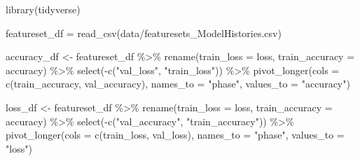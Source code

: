 \documentclass[
]{book}
\newenvironment{Shaded}{\begin{snugshade}}{\end{snugshade}}
\newcommand{\AttributeTok}[1]{\textcolor[rgb]{0.77,0.63,0.00}{#1}}
\newcommand{\FunctionTok}[1]{\textcolor[rgb]{0.00,0.00,0.00}{#1}}
\newcommand{\NormalTok}[1]{#1}
\newcommand{\OtherTok}[1]{\textcolor[rgb]{0.56,0.35,0.01}{#1}}
\newcommand{\SpecialCharTok}[1]{\textcolor[rgb]{0.00,0.00,0.00}{#1}}
\newcommand{\StringTok}[1]{\textcolor[rgb]{0.31,0.60,0.02}{#1}}
\begin{document}
\begin{Shaded}
\begin{Highlighting}[]
\FunctionTok{library}\NormalTok{(tidyverse)}
\end{Highlighting}
\end{Shaded}

\begin{Shaded}
\begin{Highlighting}[]
\NormalTok{featureset\_df }\OtherTok{=} \FunctionTok{read\_csv}\NormalTok{(}\StringTok{\textquotesingle{}data/featuresets\_ModelHistories.csv\textquotesingle{}}\NormalTok{)}

\NormalTok{accuracy\_df }\OtherTok{\textless{}{-}}\NormalTok{ featureset\_df }\SpecialCharTok{\%\textgreater{}\%}
  \FunctionTok{rename}\NormalTok{(}\AttributeTok{train\_loss =}\NormalTok{ loss, }\AttributeTok{train\_accuracy =}\NormalTok{ accuracy) }\SpecialCharTok{\%\textgreater{}\%}
  \FunctionTok{select}\NormalTok{(}\SpecialCharTok{{-}}\FunctionTok{c}\NormalTok{(}\StringTok{"val\_loss"}\NormalTok{, }\StringTok{"train\_loss"}\NormalTok{)) }\SpecialCharTok{\%\textgreater{}\%}
  \FunctionTok{pivot\_longer}\NormalTok{(}\AttributeTok{cols =} \FunctionTok{c}\NormalTok{(train\_accuracy, val\_accuracy), }\AttributeTok{names\_to =} \StringTok{"phase"}\NormalTok{, }\AttributeTok{values\_to =} \StringTok{"accuracy"}\NormalTok{)}

\NormalTok{loss\_df }\OtherTok{\textless{}{-}}\NormalTok{ featureset\_df }\SpecialCharTok{\%\textgreater{}\%}
  \FunctionTok{rename}\NormalTok{(}\AttributeTok{train\_loss =}\NormalTok{ loss, }\AttributeTok{train\_accuracy =}\NormalTok{ accuracy) }\SpecialCharTok{\%\textgreater{}\%}
  \FunctionTok{select}\NormalTok{(}\SpecialCharTok{{-}}\FunctionTok{c}\NormalTok{(}\StringTok{"val\_accuracy"}\NormalTok{, }\StringTok{"train\_accuracy"}\NormalTok{)) }\SpecialCharTok{\%\textgreater{}\%}
  \FunctionTok{pivot\_longer}\NormalTok{(}\AttributeTok{cols =} \FunctionTok{c}\NormalTok{(train\_loss, val\_loss), }\AttributeTok{names\_to =} \StringTok{"phase"}\NormalTok{, }\AttributeTok{values\_to =} \StringTok{"loss"}\NormalTok{)}
\end{Highlighting}
\end{Shaded}
\end{document}
